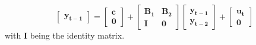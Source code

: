 \documentclass[a4paper,11pt,listof=nochaptergap,oneside,pointednumbers,bibtotoc,bigheadings,liststotoc]{scrbook}
\theoremstyle{mysatz}
\theoremstyle{mydefinition}
\theoremstyle{mybemerkung}
\newcommand{\vect}[1]{\boldsymbol{\mathbf{#1}}}
\begin{document}
\begin{itemize}
\begin{enumerate}
{$$\begin{bmatrix}
				\vect{y_{t-1}}
 				\end{bmatrix} = \begin{bmatrix} 
								\vect{c}\\
								\vect{0}
 								\end{bmatrix} + 
									\begin{bmatrix} 
									\vect{B_1} & \vect{B_2}\\
									\vect{I} & \vect{0}
 									\end{bmatrix} \begin{bmatrix} \vect{y_{t-1}}\\
												\vect{y_{t-2}}
 												\end{bmatrix} + 
												\begin{bmatrix} \vect{u_{t}}\\
												\vect{0}
 												\end{bmatrix}$$ with $\vect{I}$ being the identity matrix.		
						}
						
						
						

\end{enumerate}
\end{itemize}
\end{document}
